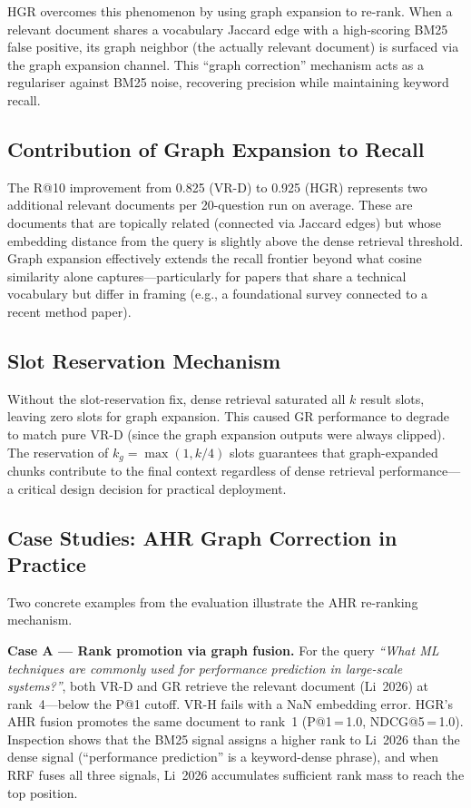 \documentclass[journal]{IEEEtran}
\begin{document}
HGR overcomes this phenomenon by using graph expansion to re-rank. When a relevant document shares a vocabulary Jaccard edge with a high-scoring BM25 false positive, its graph neighbor (the actually relevant document) is surfaced via the graph expansion channel. This ``graph correction'' mechanism acts as a regulariser against BM25 noise, recovering precision while maintaining keyword recall.

\subsection{Contribution of Graph Expansion to Recall}
The R@10 improvement from 0.825 (VR-D) to 0.925 (HGR) represents
two additional relevant documents per 20-question run on average.
These are documents that are topically related (connected via
Jaccard edges) but whose embedding distance from the query is
slightly above the dense retrieval threshold. Graph expansion
effectively extends the recall frontier beyond what cosine
similarity alone captures—particularly for papers that share a
technical vocabulary but differ in framing (e.g., a foundational
survey connected to a recent method paper).

\subsection{Slot Reservation Mechanism}
Without the slot-reservation fix, dense retrieval saturated all
$k$ result slots, leaving zero slots for graph expansion. This
caused GR performance to degrade to match pure VR-D (since the
graph expansion outputs were always clipped). The reservation
of $k_g = \max(1, k/4)$ slots guarantees that graph-expanded
chunks contribute to the final context regardless of dense
retrieval performance—a critical design decision for practical
deployment.

\subsection{Case Studies: AHR Graph Correction in Practice}

Two concrete examples from the evaluation illustrate the AHR
re-ranking mechanism.

\textbf{Case A — Rank promotion via graph fusion.}
For the query \textit{``What ML techniques are commonly used for
performance prediction in large-scale systems?''}, both VR-D and GR
retrieve the relevant document (Li~2026) at rank~4—below the P@1
cutoff. VR-H fails with a NaN embedding error. HGR's AHR fusion
promotes the same document to rank~1 (P@1\,=\,1.0, NDCG@5\,=\,1.0).
Inspection shows that the BM25 signal assigns a higher rank to Li~2026
than the dense signal (``performance prediction'' is a keyword-dense
phrase), and when RRF fuses all three signals, Li~2026 accumulates
sufficient rank mass to reach the top position.
\end{document}

